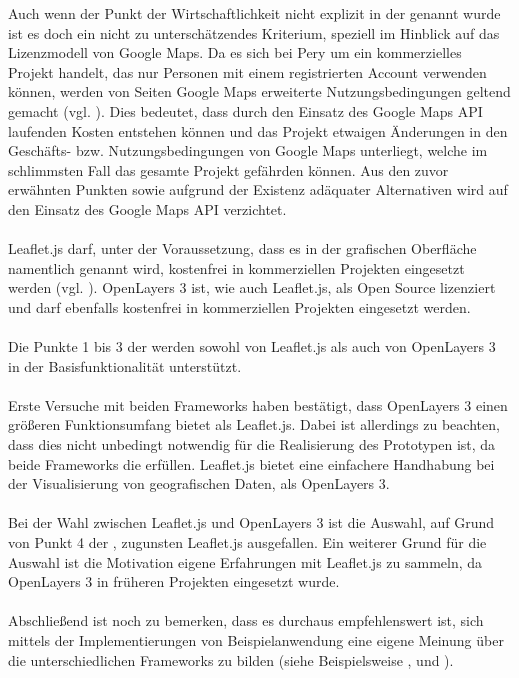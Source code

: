 \documentclass[../Bachelorarbeit.tex]{subfiles}
\begin{document}
Auch wenn der Punkt der Wirtschaftlichkeit nicht explizit in der  genannt wurde ist es doch ein nicht zu unterschätzendes Kriterium, speziell im Hinblick auf das Lizenzmodell von Google Maps.
Da es sich bei Pery um ein kommerzielles Projekt handelt, das nur Personen mit einem registrierten Account verwenden können, werden von Seiten Google Maps erweiterte Nutzungsbedingungen geltend gemacht (vgl. \cite[Abschnitt: Can I use the Google Maps APIs on a site that is password protected?]{GoogleMapsApiUsage}). 
Dies bedeutet, dass durch den Einsatz des Google Maps API laufenden Kosten entstehen können und das Projekt etwaigen Änderungen in den Geschäfts- bzw. Nutzungsbedingungen von Google Maps unterliegt, welche im schlimmsten Fall das gesamte Projekt gefährden können.
Aus den zuvor erwähnten Punkten sowie aufgrund der Existenz adäquater Alternativen wird auf den Einsatz des Google Maps API verzichtet.\\
\\
Leaflet.js darf, unter der Voraussetzung, dass es in der grafischen Oberfläche namentlich genannt wird, kostenfrei in kommerziellen Projekten eingesetzt werden (vgl. \cite[Abschnitt: Commercial Use and Licensing]{LeafletLicense}).
OpenLayers 3 ist, wie auch Leaflet.js, als Open Source lizenziert und darf ebenfalls kostenfrei in kommerziellen Projekten eingesetzt werden.\\
\\
Die Punkte 1 bis 3 der  werden sowohl von Leaflet.js als auch von OpenLayers 3 in der Basisfunktionalität unterstützt.\\
\\
Erste Versuche mit beiden Frameworks haben bestätigt, dass OpenLayers 3 einen größeren Funktionsumfang bietet als Leaflet.js. 
Dabei ist allerdings zu beachten, dass dies nicht unbedingt notwendig für die Realisierung des Prototypen ist, da beide Frameworks die  erfüllen. 
Leaflet.js bietet eine einfachere Handhabung bei der Visualisierung von geografischen Daten, als OpenLayers 3.\\
\\
Bei der Wahl zwischen Leaflet.js und OpenLayers 3 ist die Auswahl, auf Grund von Punkt 4 der , zugunsten Leaflet.js ausgefallen. 
Ein weiterer Grund für die Auswahl ist die Motivation eigene Erfahrungen mit Leaflet.js zu sammeln, da OpenLayers 3 in früheren Projekten eingesetzt wurde.\\
\\
Abschließend ist noch zu bemerken, dass es durchaus empfehlenswert ist, sich mittels der Implementierungen von Beispielanwendung eine eigene Meinung über die unterschiedlichen Frameworks zu bilden (siehe Beispielsweise \cite{OpenlayersExamples}, \cite{LeafletTutorials} und \cite{GoogleMapsExamples}).
\end{document}
